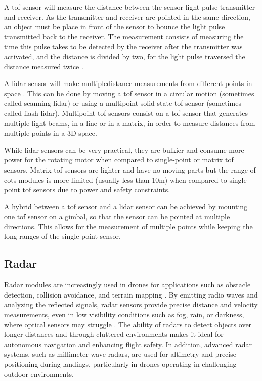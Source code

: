 A \gls{tof} sensor will measure the distance between the sensor light pulse transmitter and receiver.
As the transmitter and receiver are pointed in the same direction, an object must be place in front of
the sensor to bounce the light pulse transmitted back to the receiver. The measurement consists of measuring
the time this pulse takes to be detected by the receiver after the transmitter was activated, and the distance
is divided by two, for the light pulse traversed the distance measured twice \cite{lidar2}.

A \gls{lidar} sensor will make multipledistance measurements from different points in space \cite{lidar}. This
can be done by moving a \gls{tof} sensor in a circular motion (sometimes called scanning \gls{lidar}) or using
a multipoint solid-state \gls{tof} sensor (sometimes called flash \gls{lidar}). Multipoint \gls{tof} sensors
consist on a \gls{tof} sensor that generates multiple light beams, in a line or in a matrix, in order to measure
distances from multiple points in a 3D space.

While \gls{lidar} sensors can be very practical, they are bulkier and consume more power for the rotating
motor when compared to single-point or matrix \gls{tof} sensors. Matrix \gls{tof} sensors are lighter and have
no moving parts but the range of \gls{cots} modules is more limited (usually less than 10m) when compared to
single-point \gls{tof} sensors \cite{dronelidar} due to power and safety constraints.

A hybrid between a \gls{tof} sensor and a \gls{lidar} sensor can be achieved by mounting one \gls{tof} sensor on
a gimbal, so that the sensor can be pointed at multiple directions. This allows for the measurement of multiple points
while keeping the long ranges of the single-point sensor.

\subsection{Radar}

Radar modules are increasingly used in drones for applications such as obstacle detection,
collision avoidance, and terrain mapping \cite{radaraltimetro2}. By emitting radio waves and
analyzing the reflected signals, radar sensors provide precise distance and velocity measurements,
even in low visibility conditions such as fog, rain, or darkness, where optical sensors may
struggle \cite{introtoradar}. The ability of radars to detect objects over longer distances and through
cluttered environments makes it ideal for autonomous navigation and enhancing flight safety.
In addition, advanced radar systems, such as millimeter-wave radars, are used for altimetry and
precise positioning during landings, particularly in drones operating in challenging outdoor environments. 

